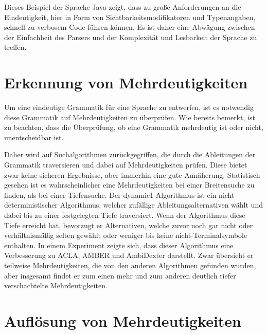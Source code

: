 \documentclass[runningheads]{llncs}
\begin{document}
    Dieses Beispiel der Sprache Java zeigt, dass zu große Anforderungen an die Eindeutigkeit,
    hier in Form von Sichtbarkeitsmodifikatoren und Typenangaben, schnell zu verbosem Code führen können.
    Es ist daher eine Abwägung zwischen der Einfachheit des Parsers und der Komplexität und Lesbarkeit der Sprache zu treffen.

    \newpage


    \section{Erkennung von Mehrdeutigkeiten}\label{sec:erkennung-von-mehrdeutigkeiten}

    Um eine eindeutige Grammatik für eine Sprache zu entwerfen,
    ist es notwendig diese Grammatik auf Mehrdeutigkeiten zu überprüfen.
    Wie bereits bemerkt, ist zu beachten, dass die Überprüfung, ob eine Grammatik mehrdeutig ist oder nicht,
    unentscheidbar ist\cite{hopcroft2006introduction}.

    Daher wird auf Suchalgorithmen zurückgegriffen, die durch die Ableitungen der Grammatik traversieren
    und dabei auf Mehrdeutigkeiten prüfen.
    Diese bietet zwar keine sicheren Ergebnisse, aber immerhin eine gute Annäherung.
    Statistisch gesehen ist es wahrscheinlicher eine Mehrdeutigkeiten bei einer Breitensuche zu finden,
    als bei einer Tiefensuche.
    Der \glqq dynamic1\grqq{}-Algorithmus\cite{vasudevan2013detecting} ist ein nicht-deterministischer Algorithmus, welcher zufällige
    Ableitungsalternativen wählt und dabei bis zu einer festgelegten Tiefe traversiert.
    Wenn der Algorithmus diese Tiefe erreicht hat, bevorzugt er Alternativen, welche zuvor noch gar nicht oder
    verhältnismäßig selten gewählt oder weniger bis keine nicht-Terminalsymbole enthalten.
    In einem Experiment\cite{vasudevan2013detecting} zeigte sich,
    dass dieser Algorithmus eine Verbesserung zu ACLA, AMBER und AmbiDexter darstellt.
    Zwar übersieht er teilweise Mehrdeutigkeiten, die von den anderen Algorithmen gefunden wurden,
    aber insgesamt findet er zum einen mehr und zum anderen deutlich tiefer verschachtelte Mehrdeutigkeiten.


    \section{Auflösung von Mehrdeutigkeiten}\label{sec:auflosung-von-mehrdeutigkeiten}
\end{document}
